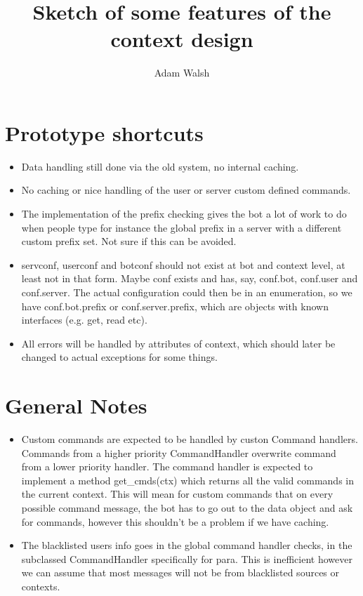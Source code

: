 \documentclass[a4paper]{amsart}
\title{Sketch of some features of the context design}
\author{Adam Walsh}
\begin{document}
\maketitle

\section{Prototype shortcuts}
\begin{itemize}
    \item Data handling still done via the old system, no internal caching.
    \item No caching or nice handling of the user or server custom defined commands.
    \item The implementation of the prefix checking gives the bot a lot of work to do when people type for instance the global prefix in a server with a different custom prefix set. Not sure if this can be avoided.
    \item servconf, userconf and botconf should not exist at bot and context level, at least not in that form. Maybe conf exists and has, say, conf.bot, conf.user and conf.server. The actual configuration could then be in an enumeration, so we have conf.bot.prefix or conf.server.prefix, which are objects with known interfaces (e.g. get, read etc).
    \item All errors will be handled by attributes of context, which should later be changed to actual exceptions for some things.
\end{itemize}


\section{General Notes}
\begin{itemize}
    \item Custom commands are expected to be handled by custon Command handlers. Commands from a higher priority CommandHandler overwrite command from a lower priority handler. The command handler is expected to implement a method {get\_cmds(ctx)} which returns all the valid commands in the current context. This will mean for custom commands that on every possible command message, the bot has to go out to the data object and ask for commands, however this shouldn't be a problem if we have caching. 
    \item The blacklisted users info goes in the global command handler checks, in the subclassed CommandHandler specifically for para. This is inefficient however we can assume that most messages will not be from blacklisted sources or contexts.
\end{itemize}
\end{document}
